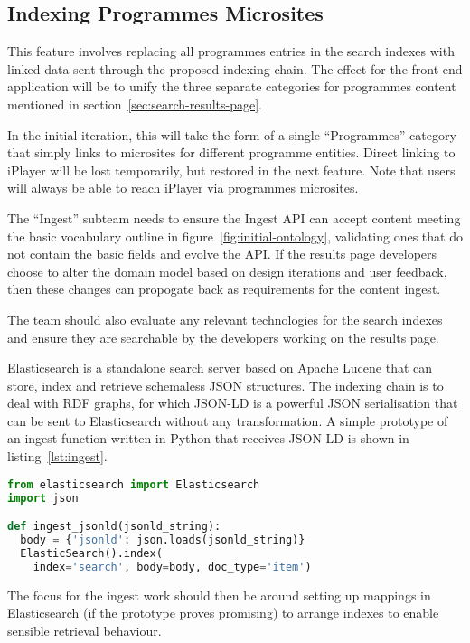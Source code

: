 \subsection{Indexing Programmes Microsites}

This feature involves replacing all programmes entries in
the search indexes with linked data sent through the proposed
indexing chain. The effect for the front end application
will be to unify the three separate categories for
programmes content mentioned in section~\ref{sec:search-results-page}.

In the initial iteration, this will take the form of a single
``Programmes'' category that simply links to microsites
for different programme entities. Direct linking to iPlayer
will be lost temporarily, but restored in the next
feature. Note that users will always be able to reach
iPlayer via programmes microsites.

The ``Ingest'' subteam needs to ensure the Ingest API can
accept content meeting the basic vocabulary outline in
figure~\ref{fig:initial-ontology}, validating ones
that do not contain the basic fields and evolve the API. If
the results page developers choose to alter the domain
model based on design iterations and user feedback, then
these changes can propogate back as requirements for the
content ingest.

The team should also evaluate any relevant technologies for the
search indexes and ensure they are searchable by the
developers working on the results page.

Elasticsearch is a standalone search server based on Apache Lucene
that can store, index and retrieve schemaless JSON structures.
The indexing chain is to deal with RDF graphs, for which JSON-LD
is a powerful JSON serialisation that can be sent to Elasticsearch
without any transformation.
A simple prototype of an ingest function written in Python
that receives JSON-LD is shown in listing~\ref{lst:ingest}.

\begin{lstlisting}[language=Python,label=lst:ingest]
from elasticsearch import Elasticsearch
import json

def ingest_jsonld(jsonld_string):
  body = {'jsonld': json.loads(jsonld_string)}
  ElasticSearch().index(
    index='search', body=body, doc_type='item')
\end{lstlisting}

The focus for the ingest work should then be around setting
up mappings in Elasticsearch (if the prototype proves promising)
to arrange indexes to enable sensible retrieval behaviour.

